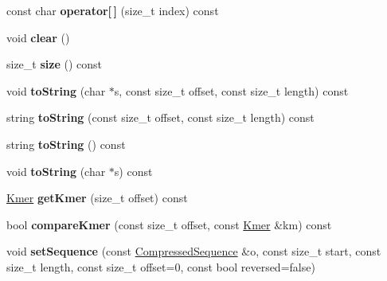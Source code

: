 \begin{DoxyCompactItemize}
\item 
\mbox{\label{classCompressedSequence_aa108e2be676ba175d2c700df652b26ba}} 
const char {\bfseries operator\mbox{[}$\,$\mbox{]}} (size\+\_\+t index) const
\item 
\mbox{\label{classCompressedSequence_a392eefa95a8ead20c8379edebacadcd4}} 
void {\bfseries clear} ()
\item 
\mbox{\label{classCompressedSequence_a81353e1469985324c10438cd5aa824a1}} 
size\+\_\+t {\bfseries size} () const
\item 
\mbox{\label{classCompressedSequence_a96efc15beda1265703efa608e71bed23}} 
void {\bfseries to\+String} (char $\ast$s, const size\+\_\+t offset, const size\+\_\+t length) const
\item 
\mbox{\label{classCompressedSequence_a02b58973e8d06659b9a9ee27fb9ccb2b}} 
string {\bfseries to\+String} (const size\+\_\+t offset, const size\+\_\+t length) const
\item 
\mbox{\label{classCompressedSequence_a6ecc7f92f66754aa08b024515071e2f4}} 
string {\bfseries to\+String} () const
\item 
\mbox{\label{classCompressedSequence_ab38d1a69f890b612e33060ff67f29010}} 
void {\bfseries to\+String} (char $\ast$s) const
\item 
\mbox{\label{classCompressedSequence_aea4c71bbf92b993bd64af17caf544930}} 
\hyperlink{classKmer}{Kmer} {\bfseries get\+Kmer} (size\+\_\+t offset) const
\item 
\mbox{\label{classCompressedSequence_a8e158ef4ef153106342c4fcc7a210043}} 
bool {\bfseries compare\+Kmer} (const size\+\_\+t offset, const \hyperlink{classKmer}{Kmer} \&km) const
\item 
\mbox{\label{classCompressedSequence_a63a07166d1470472aa2f6eaecddb31bb}} 
void {\bfseries set\+Sequence} (const \hyperlink{classCompressedSequence}{Compressed\+Sequence} \&o, const size\+\_\+t start, const size\+\_\+t length, const size\+\_\+t offset=0, const bool reversed=false)

\end{DoxyCompactItemize}
